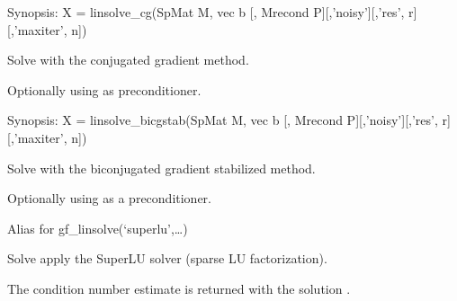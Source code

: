 \documentclass[a4paper,11pt,english]{sphinxmanual}
\begin{document}
\begin{fulllineitems}
\label{\detokenize{python/cmdref_Module linsolve:getfem.linsolve_cg}}
Synopsis: X = linsolve\_cg(SpMat M, vec b {[}, Mrecond P{]}{[},’noisy’{]}{[},’res’, r{]}{[},’maxiter’, n{]})

Solve  with the conjugated gradient method.

Optionally using  as preconditioner.

\end{fulllineitems}


\begin{fulllineitems}
\label{\detokenize{python/cmdref_Module linsolve:getfem.linsolve_bicgstab}}
Synopsis: X = linsolve\_bicgstab(SpMat M, vec b {[}, Mrecond P{]}{[},’noisy’{]}{[},’res’, r{]}{[},’maxiter’, n{]})

Solve  with the bi\sphinxhyphen{}conjugated gradient stabilized method.

Optionally using  as a preconditioner.

\end{fulllineitems}


\begin{fulllineitems}
\label{\detokenize{python/cmdref_Module linsolve:getfem.linsolve_lu}}
Alias for gf\_linsolve(‘superlu’,…)

\end{fulllineitems}


\begin{fulllineitems}
\label{\detokenize{python/cmdref_Module linsolve:getfem.linsolve_superlu}}
Solve  apply the SuperLU solver (sparse LU factorization).

The condition number estimate  is returned with the solution .

\end{fulllineitems}
\end{document}
